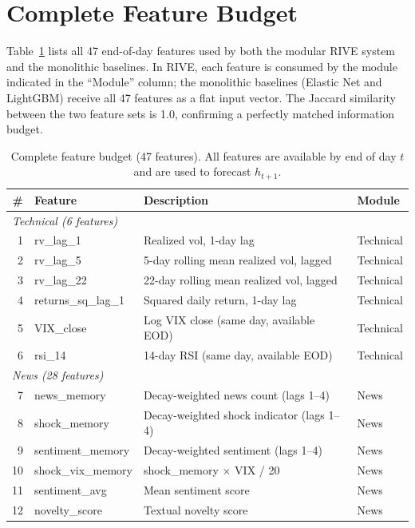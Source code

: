 \documentclass[review]{elsarticle}
\begin{document}
\newpage
\appendix

\section{Complete Feature Budget}\label{app:features}

Table~\ref{tab:full-feature-budget} lists all 47 end-of-day features used by both the modular RIVE system and the monolithic baselines. In RIVE, each feature is consumed by the module indicated in the ``Module'' column; the monolithic baselines (Elastic Net and LightGBM) receive all 47 features as a flat input vector. The Jaccard similarity between the two feature sets is 1.0, confirming a perfectly matched information budget.

\begin{table}[H]
\centering
\caption{Complete feature budget (47 features). All features are available by end of day $t$ and are used to forecast $h_{t+1}$.}
\label{tab:full-feature-budget}
\small
\begin{tabular}{rlll}
\toprule
\# & Feature & Description & Module \\
\midrule
\multicolumn{4}{l}{\textit{Technical (6 features)}} \\
1 & rv\_lag\_1 & Realized vol, 1-day lag & Technical \\
2 & rv\_lag\_5 & 5-day rolling mean realized vol, lagged & Technical \\
3 & rv\_lag\_22 & 22-day rolling mean realized vol, lagged & Technical \\
4 & returns\_sq\_lag\_1 & Squared daily return, 1-day lag & Technical \\
5 & VIX\_close & Log VIX close (same day, available EOD) & Technical \\
6 & rsi\_14 & 14-day RSI (same day, available EOD) & Technical \\
\midrule
\multicolumn{4}{l}{\textit{News (28 features)}} \\
7 & news\_memory & Decay-weighted news count (lags 1--4) & News \\
8 & shock\_memory & Decay-weighted shock indicator (lags 1--4) & News \\
9 & sentiment\_memory & Decay-weighted sentiment (lags 1--4) & News \\
10 & shock\_vix\_memory & shock\_memory $\times$ VIX / 20 & News \\
11 & sentiment\_avg & Mean sentiment score & News \\
12 & novelty\_score & Textual novelty score & News \\

\end{tabular}
\end{table}
\end{document}
